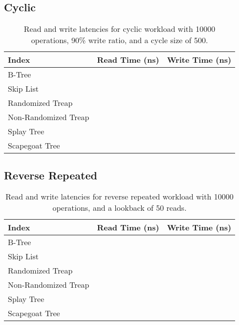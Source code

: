 \documentclass[sigconf]{acmart}
\begin{document}
\subsection{Cyclic}
\begin{center}
  \begin{table}[H]
    \begin{tabular}{| l | c | c |}
      \hline
      \bf{Index} & \bf{Read Time (ns)} & \bf{Write Time (ns)} \\
      \hline
      B-Tree & & \\
      \hline
      Skip List & & \\
      \hline
      Randomized Treap & & \\
      \hline
      Non-Randomized Treap & & \\
      \hline
      Splay Tree & & \\
      \hline
      Scapegoat Tree & & \\
      \hline
    \end{tabular}
    \caption{Read and write latencies for cyclic workload with 10000 operations, 90\% write ratio, and a cycle size of 500.}
  \end{table}
\end{center}

\subsection{Reverse Repeated}
\begin{center}
  \begin{table}[H]
    \begin{tabular}{| l | c | c |}
      \hline
      \bf{Index} & \bf{Read Time (ns)} & \bf{Write Time (ns)} \\
      \hline
      B-Tree & & \\
      \hline
      Skip List & & \\
      \hline
      Randomized Treap & & \\
      \hline
      Non-Randomized Treap & & \\
      \hline
      Splay Tree & & \\
      \hline
      Scapegoat Tree & & \\
      \hline
    \end{tabular}
    \caption{Read and write latencies for reverse repeated workload with 10000 operations, and a lookback of 50 reads.}
  \end{table}
\end{center}
\end{document}
